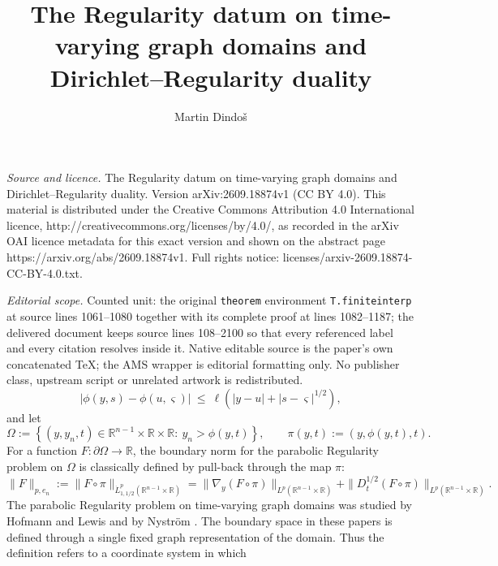 \documentclass[10pt,a4paper]{amsart}
\numberwithin{equation}{section}
\newcommand{\R}{\mathbb R}
\newcommand{\abs}[1]{\left\vert#1\right\vert}
\newcommand{\br}[1]{\left(#1\right)}
\newcommand{\set}[1]{\left\{#1\right\}}
\newcommand{\om}{\Omega}
\newcommand{\pom}{\partial\Omega}
\newcommand{\dhalf}{D_t^{1/2}}
\begin{document}
\title[The Regularity datum on time-varying graph domains and Diric]{The Regularity datum on time-varying graph domains and Dirichlet--Regularity duality}
\author{Martin Dindoš}
\date{}
\maketitle
\noindent\emph{Source and licence.} The Regularity datum on time-varying graph domains and Dirichlet--Regularity duality. Version arXiv:2609.18874v1 (CC BY 4.0). This material is distributed under the Creative Commons Attribution 4.0 International licence, http://creativecommons.org/licenses/by/4.0/, as recorded in the arXiv OAI licence metadata for this exact version and shown on the abstract page https://arxiv.org/abs/2609.18874v1. Full rights notice: licenses/arxiv-2609.18874-CC-BY-4.0.txt.\par\smallskip
\noindent\textit{Editorial scope.} Counted unit: the original \texttt{theorem} environment \texttt{T.finiteinterp} at source lines 1061--1080 together with its complete proof at lines 1082--1187; the delivered document keeps source lines 108--2100 so that every referenced label and every citation resolves inside it. Native editable source is the paper's own concatenated TeX; the AMS wrapper is editorial formatting only. No publisher class, upstream script or unrelated artwork is redistributed.
\begin{equation}\label{E.lip}
  \abs{\phi(y,s)-\phi(u,\varsigma)}\ \le\ \ell\br{\abs{y-u}
   +\abs{s-\varsigma}^{1/2}} ,
\end{equation}
and let
\begin{equation}\label{E.dom}
  \om:=\set{(y,y_n,t)\in\R^{n-1}\times\R\times\R:\ y_n>\phi(y,t)},\qquad
  \pi(y,t):=\br{y,\phi(y,t),t} .
\end{equation}
For a function $F:\pom\to\R$, the boundary norm for the parabolic Regularity
problem on $\om$ is classically defined by pull-back through the map $\pi$:
\begin{equation}\label{E.datum}
  \|F\|_{p,e_n}:=\big\|F\circ\pi\big\|_{\dot L^p_{1,1/2}(\R^{n-1}\times\R)}
  =\|\nabla_y(F\circ\pi)\|_{L^p(\R^{n-1}\times\R)}
   +\|\dhalf(F\circ\pi)\|_{L^p(\R^{n-1}\times\R)}.
\end{equation}
The parabolic Regularity problem on time-varying graph domains was studied by
Hofmann and Lewis \cite{HL,HL99} and by Nystr\"om \cite{Nys06}. The boundary
space in these papers is defined through a single fixed graph representation
of the domain. Thus the definition refers to a coordinate system in which
\end{document}
